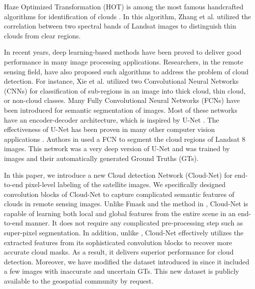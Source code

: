 \documentclass{article}
\begin{document}
Haze Optimized Transformation (HOT) \cite{hot} is among the most famous handcrafted algorithms for identification of clouds \cite{bag}. In this algorithm, Zhang et al. utilized the correlation between two spectral bands of Landsat images to distinguish thin clouds from clear regions.

In recent years, deep learning-based methods have been proved to deliver good performance in many image processing applications. Researchers, in the remote sensing field, have also proposed such algorithms to address the problem of cloud detection. For instance, Xie et al. \cite{multilevel} utilized two Convolutional Neural Networks (CNNs) for classification of sub-regions in an image into thick cloud, thin cloud, or non-cloud classes. Many Fully Convolutional Neural Networks (FCNs) have been introduced for semantic segmentation of images. Most of these networks have an encoder-decoder architecture, which is inspired by U-Net \cite{unet}. The effectiveness of U-Net has been proven in many other computer vision applications \cite{3DUNet,reza-unet}. Authors in \cite{mymmsp} used a FCN to segment the cloud regions of Landsat 8 images. This network was a very deep version of U-Net and was trained by images and their automatically generated Ground Truths (GTs).

In this paper, we introduce a new Cloud detection Network (Cloud-Net) for end-to-end pixel-level labeling of the satellite images. We specifically designed convolution blocks of Cloud-Net to capture complicated semantic features of clouds in remote sensing images. Unlike Fmask and the method in \cite{multilevel}, Cloud-Net is capable of learning both local and global features from the entire scene in an end-to-end manner. It does not require any complicated pre-processing step such as super-pixel segmentation. In addition, unlike \cite{mymmsp}, Cloud-Net effectively utilizes the extracted features from its sophisticated convolution blocks to recover more accurate cloud masks. As a result, it delivers superior performance for cloud detection. Moreover, we have modified the dataset introduced in \cite{mymmsp} since it included a few images with inaccurate and uncertain GTs. This new dataset is publicly available to the geospatial community by request.
\end{document}
